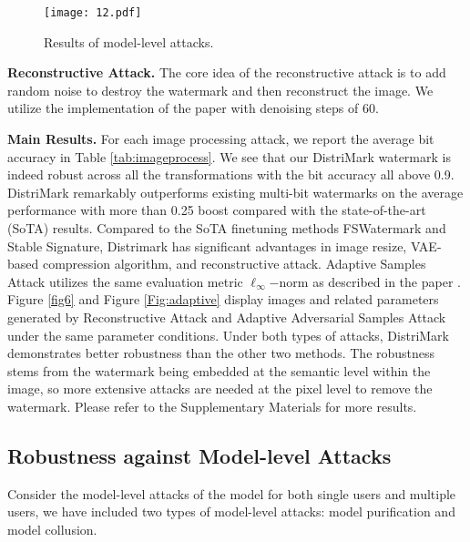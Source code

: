 \begin{figure}[t]
  \centering
  \texttt{[image: 12.pdf]}
  
  \caption{
 Results of model-level attacks.
  }
  \label{Fig:modelattack}
\end{figure}







\noindent\textbf{Reconstructive Attack.}
The core idea of the reconstructive attack is to add random noise to destroy the watermark and then reconstruct the image. We utilize the implementation of the paper \cite{zhao2023invisible} with denoising steps of 60.

\noindent\textbf{Main Results.}
 For each image processing attack, we report the average bit accuracy in Table \ref{tab:imageprocess}. We see that our DistriMark watermark is indeed robust  across all the transformations with the bit accuracy all above 0.9. DistriMark remarkably outperforms existing multi-bit watermarks on the average performance with more than 0.25 boost compared with the state-of-the-art (SoTA) results. Compared to the SoTA finetuning methods FSWatermark and Stable Signature, Distrimark has significant advantages in image resize, VAE-based compression algorithm, and reconstructive attack. Adaptive Samples Attack utilizes the same evaluation metric ${\ell}_{\infty}\mathrm{-norm}$ as described in the paper \cite{jiang2023evading}. Figure \ref{fig6} and Figure \ref{Fig:adaptive} display images and related parameters generated by Reconstructive Attack and Adaptive Adversarial Samples Attack under the same parameter conditions.  Under both types of attacks, DistriMark demonstrates better robustness than the other two methods. The robustness stems from the watermark being embedded at the semantic level within the image, so more extensive attacks are needed at the pixel level to remove the watermark. Please refer to the Supplementary Materials for more results.









\subsection{Robustness against Model-level Attacks}

Consider the model-level attacks of the model for both single users and multiple users, we have included two types of model-level attacks: model purification and model collusion. 


